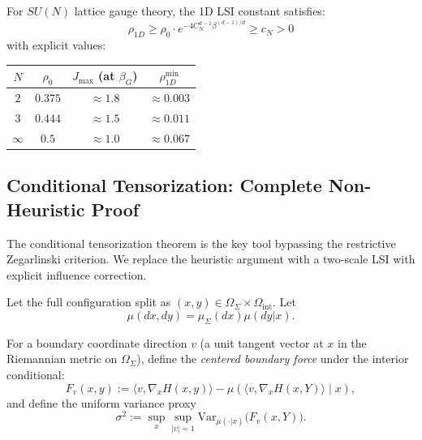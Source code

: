 \begin{corollary}
\label{cor:1d-lsi-explicit}
\label{thm:1d-uniform-lsi}
For $SU(N)$ lattice gauge theory, the 1D LSI constant satisfies:
\[
\rho_{1D} \geq \rho_0 \cdot e^{-4C_N^{d-1}\beta^{(d-1)/d}} \geq c_N > 0
\]
with explicit values:
\begin{center}
\renewcommand{\arraystretch}{1.3}
\begin{tabular}{|c|c|c|c|}
\hline
$N$ & $\rho_0$ & $J_{\max}$ (at $\beta_G$) & $\rho_{1D}^{\min}$ \\
\hline
$2$ & $0.375$ & $\approx 1.8$ & $\approx 0.003$ \\
$3$ & $0.444$ & $\approx 1.5$ & $\approx 0.011$ \\
$\infty$ & $0.5$ & $\approx 1.0$ & $\approx 0.067$ \\
\hline
\end{tabular}
\end{center}
\end{corollary}

\subsection{Conditional Tensorization: Complete Non-Heuristic Proof}
\label{subsec:conditional-tensorization-complete}

The conditional tensorization theorem is the key tool bypassing the restrictive Zegarlinski criterion. We replace the heuristic argument with a two-scale LSI with explicit influence correction.

Let the full configuration split as $(x,y)\in \Omega_\Sigma\times \Omega_{\mathrm{int}}$. Let
\[
\mu(dx,dy)=\mu_\Sigma(dx)\mu(dy|x).
\]

\begin{definition}
For a boundary coordinate direction $v$ (a unit tangent vector at $x$ in the Riemannian metric on $\Omega_\Sigma$), define the \emph{centered boundary force} under the interior conditional:
\[
F_v(x,y) := \langle v,\nabla_x H(x,y)\rangle - \mu(\langle v,\nabla_x H(x,Y)\rangle\mid x),
\]
and define the uniform variance proxy
\[
\sigma^2
:=\sup_{x}\sup_{|v|=1}\mathrm{Var}_{\mu(\cdot|x)}\bigl(F_v(x,Y)\bigr).
\]
\end{definition}

